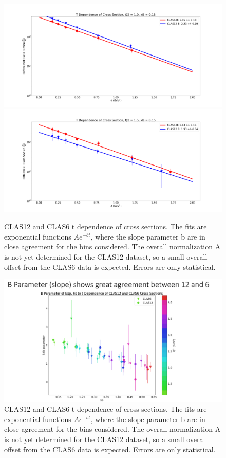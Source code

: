     
    \begin{figure}[hbt]
    	\centering
    	\includegraphics[page=125,width=0.45\linewidth]{Chapters/Ch5-Further/t_dependence/pics/fig_1.0_0.15.png}
    	\includegraphics[page=130,width=0.45\linewidth]{Chapters/Ch5-Further/t_dependence/pics/fig_1.5_0.15.png}
    
    	\caption[t dependence]{CLAS12 and CLAS6 t dependence of cross sections. The fits are exponential functions $Ae^{-bt}$, where the slope parameter b are in close agreement for the bins considered. The overall normalization A is not yet determined for the CLAS12 dataset, so a small overall offset from the CLAS6 data is expected. Errors are only statistical.}
    	\label{fig:tdep}
    \end{figure}
    
    
    \begin{figure}[hbt]
    	\centering
    	\includegraphics[trim={0 0 0 2.2cm},clip,width=0.8\linewidth]{Chapters/Ch5-Further/t_dependence/pics/bslopes.png}
    
    	\caption[Bslopes]{CLAS12 and CLAS6 t dependence of cross sections. The fits are exponential functions $Ae^{-bt}$, where the slope parameter b are in close agreement for the bins considered. The overall normalization A is not yet determined for the CLAS12 dataset, so a small overall offset from the CLAS6 data is expected. Errors are only statistical.}
    	\label{fig:bslopes}
    \end{figure}

